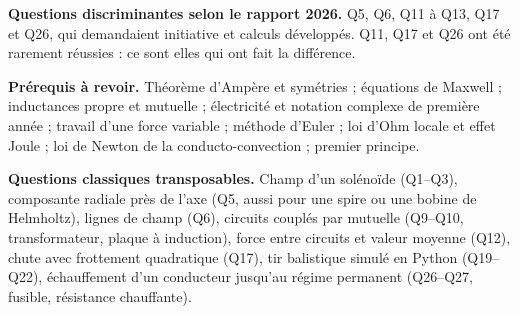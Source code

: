 \documentclass[11pt,a4paper]{article}
\begin{document}
\textbf{Questions discriminantes selon le rapport 2026.} Q5, Q6, Q11 à Q13, Q17 et Q26, qui demandaient initiative et calculs développés. Q11, Q17 et Q26 ont été rarement réussies : ce sont elles qui ont fait la différence.

\textbf{Prérequis à revoir.} Théorème d'Ampère et symétries ; équations de Maxwell ; inductances propre et mutuelle ; électricité et notation complexe de première année ; travail d'une force variable ; méthode d'Euler ; loi d'Ohm locale et effet Joule ; loi de Newton de la conducto-convection ; premier principe.

\textbf{Questions classiques transposables.} Champ d'un solénoïde (Q1--Q3), composante radiale près de l'axe (Q5, aussi pour une spire ou une bobine de Helmholtz), lignes de champ (Q6), circuits couplés par mutuelle (Q9--Q10, transformateur, plaque à induction), force entre circuits et valeur moyenne (Q12), chute avec frottement quadratique (Q17), tir balistique simulé en Python (Q19--Q22), échauffement d'un conducteur jusqu'au régime permanent (Q26--Q27, fusible, résistance chauffante).
\end{document}
